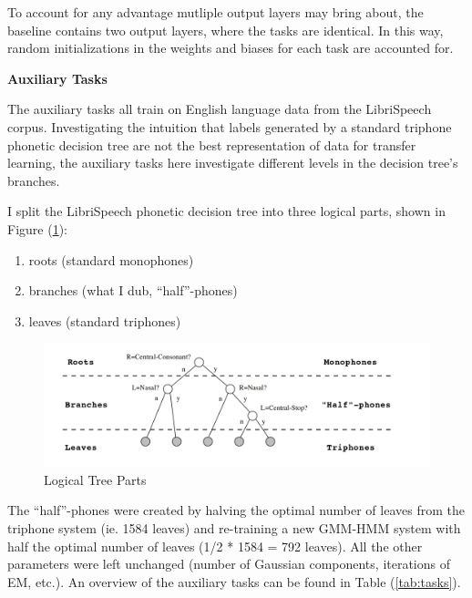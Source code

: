 \documentclass[a4paper]{article}
\begin{document}
To account for any advantage mutliple output layers may bring about, the baseline contains two output layers, where the tasks are identical. In this way, random initializations in the weights and biases for each task are accounted for.

\textbf{Auxiliary Tasks}

The auxiliary tasks all train on English language data from the LibriSpeech corpus. Investigating the intuition that labels generated by a standard triphone phonetic decision tree are not the best representation of data for transfer learning, the auxiliary tasks here investigate different levels in the decision tree's branches.

I split the LibriSpeech phonetic decision tree into three logical parts, shown in Figure (\ref{fig:tree-parts}):

\begin{enumerate}
\item roots (standard monophones)
\item branches (what I dub, ``half''-phones)
\item leaves (standard triphones)
\end{enumerate}




\begin{figure}[!htbp]
  \centering
{}
  \includegraphics[width=\linewidth]{figs/levels.png}
  \caption{Logical Tree Parts}
  \label{fig:tree-parts}
\endminipage\hfill
\end{figure}


The ``half''-phones were created by halving the optimal number of leaves from the triphone system (ie. 1584 leaves) and re-training a new GMM-HMM system with half the optimal number of leaves (1/2 * 1584 = 792 leaves). All the other parameters were left unchanged (number of Gaussian components, iterations of EM, etc.). An overview of the auxiliary tasks can be found in Table (\ref{tab:tasks}).
\end{document}
